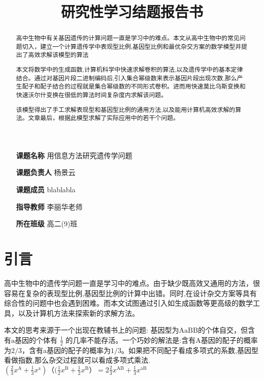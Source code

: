 \documentclass{article}
\title{研究性学习结题报告书}
\author{}
\begin{document}
\maketitle

\begin{itemize}
    \item[\textbf{课题名称}] 用信息方法研究遗传学问题 \centering
    \item[\textbf{课题负责人}] 杨景云
    \item[\textbf{课题成员}] blablabla
    \item[\textbf{指导教师}] 李丽华老师
    \item[\textbf{所在班级}] 高二(9)班
\end{itemize}

\begin{abstract}
    高中生物中有关基因遗传的计算问题一直是学习中的难点。本文从高中生物中的常见问题切入，建立一个计算遗传学中表现型比例,基因型比例和最优杂交方案的数学模型并提出了高效求解该模型的算法
    
    本文将数学中的生成函数,计算机科学中快速求解卷积的算法,以及遗传学中的基本定律结合。通过对基因片段二进制编码后,引入集合幂级数来表示基因片段出现次数,那么产生配子和配子结合的过程就是集合幂级数的不同形式卷积。进而用快速莫比乌斯变换和快速沃尔什变换在很低的算法时间复杂度内求解该问题。
    
    该模型得出了手工求解表现型和基因型比例的通用方法,以及能用计算机高效求解的算法。文章最后，根据此模型求解了实际应用中的若干个问题。
\end{abstract}

\newpage

\tableofcontents %

\newpage

\section{引言}

高中生物中的遗传学问题一直是学习中的难点。由于缺少既高效又通用的方法，很容易在复杂的表现型比例,基因型比例的计算中出错。同时,在设计杂交方案等具有综合性的问题中也会遇到困难。而本文试图通过引入如生成函数等更高级的数学工具，以及计算机方法来探索新的求解方法。

本文的思考来源于一个出现在教辅书上的问题: 基因型为$\text{AaBB}$的个体自交，但含有$\text{a}$基因的个体有 $\frac{1}{2} $ 的几率不能存活。一个巧妙的解法是:含有A基因的配子的概率为$2/3$，含有a基因的配子的概率为$1/3$。如果把不同配子看成多项式的系数,基因型看做指数,那么杂交过程就可以看成多项式乘法. 
$(\frac{2}{3}x^{\text{A}}+\frac{1}{3} x^{\text{a}})（(\frac{1}{2}x^{\text{B}}+\frac{1}{2}x^{\text{B}}）=2 \frac{2}{3}x^{\text{AB}}+\frac{1}{3}x^{\text{aB}}$
\end{document}
